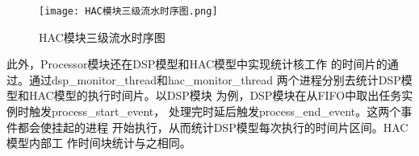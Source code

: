 \begin{figure}
    \centering
    \texttt{[image: HAC模块三级流水时序图.png]}
    \caption{HAC模块三级流水时序图}
    \label{fig:badge}
\end{figure}

此外，Processor模块还在DSP模型和HAC模型中实现统计核工作
的时间片的通过。通过dsp\_monitor\_thread和hac\_monitor\_thread
两个进程分别去统计DSP模型和HAC模型的执行时间片。以DSP模块
为例，DSP模块在从FIFO中取出任务实例时触发process\_start\_event，
处理完时延后触发process\_end\_event。这两个事件都会使挂起的进程
开始执行，从而统计DSP模型每次执行的时间片区间。HAC模型内部工
作时间块统计与之相同。






